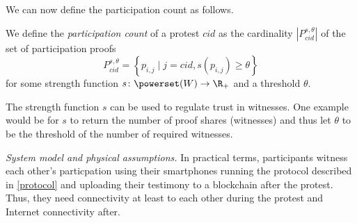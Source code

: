 We can now define the participation count as follows.
\begin{definition}
  We define the \emph{participation count} of a protest \(cid\) as the cardinality \(|P_{cid}^{s,\theta}|\) of the set of participation proofs \[
    P_{cid}^{s,\theta} = \left\{ p_{i,j} \mid
      j = cid, s(p_{i,j})\geq \theta \right\}
  \] for some strength function \(s\colon \powerset(W)\to \R_+\) and a threshold 
  \(\theta\).
\end{definition}
The strength function \(s\) can be used to regulate trust in witnesses.
One example would be for \(s\) to return the number of proof shares (\ie witnesses) and thus let \(\theta\) to be the threshold of the number of required witnesses.

\emph{System model and physical assumptions.}
In practical terms, participants witness each other's particpation using their smartphones running the protocol described in \cref{protocol} and uploading their testimony to a blockchain after the protest. 
Thus, they need connectivity at least to each other during the protest and Internet connectivity after. 


